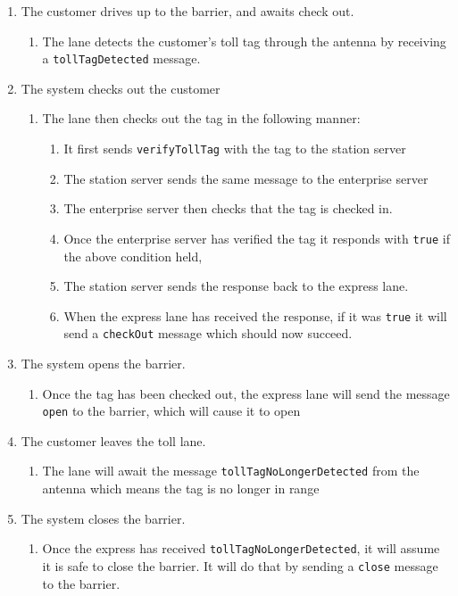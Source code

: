 \begin{enumerate}
\item The customer drives up to the barrier, and awaits check out.

\begin{enumerate}
\item The lane detects the customer's toll tag through the antenna by receiving
a \texttt{tollTagDetected} message.
\end{enumerate}
\item The system checks out the customer

\begin{enumerate}
\item The lane then checks out the tag in the following manner:

\begin{enumerate}
\item It first sends \texttt{verifyTollTag} with the tag to the station server
\item The station server sends the same message to the enterprise server
\item The enterprise server then checks that the tag is checked in.
\item Once the enterprise server has verified the tag it responds with \texttt{true}
if the above condition held,
\item The station server sends the response back to the express lane.
\item When the express lane has received the response, if it was \texttt{true} it
will send a \texttt{checkOut} message which should now succeed.
\end{enumerate}
\end{enumerate}
\item The system opens the barrier.

\begin{enumerate}
\item Once the tag has been checked out, the express lane will send the
message \texttt{open} to the barrier, which will cause it to open
\end{enumerate}
\item The customer leaves the toll lane.

\begin{enumerate}
\item The lane will await the message \texttt{tollTagNoLongerDetected} from the antenna
which means the tag is no longer in range
\end{enumerate}
\item The system closes the barrier.

\begin{enumerate}
\item Once the express has received \texttt{tollTagNoLongerDetected}, it will assume
it is safe to close the barrier. It will do that by sending a \texttt{close}
message to the barrier.\end{enumerate}
\end{enumerate}

